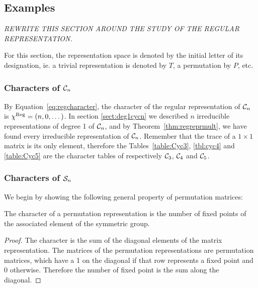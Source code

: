 \subsection{Examples}

\textit{REWRITE THIS SECTION AROUND THE STUDY OF THE REGULAR REPRESENTATION.}

For this section, the representation space is denoted by the initial letter of its designation, ie. a trivial representation is denoted by $T$, a permutation by $P$, etc.

\subsubsection{Characters of $\mathcal{C}_n$}

\begin{example}
	By Equation~\ref{eq:regcharacter}, the character of the regular representation of $\mathcal{C}_n$ is $\chi^{\text{Reg}} = (n, 0, \dots)$. In section \ref{sect:deg1cycn} we described $n$ irreducible representations of degree 1 of  $\mathcal{C}_n$, and by Theorem~\ref{thm:regreprmult}, we have found every irreducible representation of $\mathcal{C}_n$. Remember that the trace of a $1 \times 1$ matrix is its only element, therefore the Tables~\ref{table:Cyc3}, \ref{tbl:cyc4} and \ref{table:Cyc5} are the character tables of respectively $\mathcal{C}_3$, $\mathcal{C}_4$ and $\mathcal{C}_5$.
\end{example}

\subsubsection{Characters of $\mathcal{S}_n$}

We begin by showing the following general property of permutation matrices:

\begin{theorem}
	The character of a permutation representation is the number of fixed points of the associated element of the symmetric group.
\end{theorem}
\begin{proof}
	The character is the sum of the diagonal elements of the matrix representation. The matrices of the permutation representations are permutation matrices, which have a 1 on the diagonal if that row represents a fixed point and 0 otherwise. Therefore the number of fixed point is the sum along the diagonal.
\end{proof}

